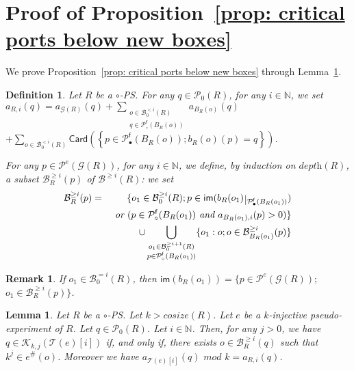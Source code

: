 \documentclass{article}
\theoremstyle{plain}
\newtheorem{definition}{Definition}
\newtheorem{lem}[theorem]{Lemma}
\newtheorem{rem}{Remark}
\newcommand{\Nat}{\ensuremath{\mathbb{N}}}
\newcommand{\taylor}[2]{\mathcal{T}(#1)[#2]}
\newcommand{\criticalports}[3]{\mathcal{K}_{#2, #3}(#1)}
\newcommand{\groundof}[1]{\mathcal{G}(#1)}
\newcommand{\cosize}[1]{\textit{cosize}(#1)}
\newcommand{\depthof}[1]{\textit{depth}(#1)}
\def\restriction#1#2{\mathchoice
              {\setbox1\hbox{${\displaystyle #1}_{\scriptstyle #2}$}
              \restrictionaux{#1}{#2}}
              {\setbox1\hbox{${\textstyle #1}_{\scriptstyle #2}$}
              \restrictionaux{#1}{#2}}
              {\setbox1\hbox{${\scriptstyle #1}_{\scriptscriptstyle #2}$}
              \restrictionaux{#1}{#2}}
              {\setbox1\hbox{${\scriptscriptstyle #1}_{\scriptscriptstyle #2}$}
              \restrictionaux{#1}{#2}}}
\def\restrictionaux#1#2{{#1\,\smash{\vrule height .8\ht1 depth .85\dp1}}_{\,#2}}
\newcommand{\im}[1]{\textsf{im}(#1)}
\newcommand{\portsatzero}[1]{\mathcal{P}_0(#1)}
\newcommand{\arity}[1]{{\textit{a}}_{#1}}
\newcommand{\Card}[1]{\textsf{Card}\left( #1 \right)}
\newcommand{\conclusionscirc}[1]{\mathcal{P}_\circ^{\textsf{f}}(#1)}
\newcommand{\conclusionsnotcirc}[1]{\mathcal{P}_\bullet^{\textsf{f}}(#1)}
\newcommand{\exactboxesatzero}[2]{\mathcal{B}_{0}^{=#2}(#1)}
\newcommand{\boxesgeq}[2]{\mathcal{B}^{\geq #2}(#1)}
\newcommand{\boxesatzerogeq}[2]{\mathcal{B}_0^{\geq #2}(#1)}
\newcommand{\boxesatzerosmaller}[2]{\mathcal{B}_0^{< #2}(#1)}
\newcommand{\exponentialports}[1]{\mathcal{P}^{\textit{e}}(#1)}
\begin{document}
\section{Proof of Proposition~\ref{prop: critical ports below new boxes}}


We prove Proposition~\ref{prop: critical ports below new boxes} through Lemma~\ref{lem: arity{taylor{e}{i}}(c) for c at depth 0}. 


\begin{definition}
Let $R$ be a $\circ$-PS. 
For any $q \in \portsatzero{R}$, for any $i \in \Nat$, we set 
$\arity{R, i}(q) = \arity{\groundof{R}}(q) + \sum_{\substack{o \in \boxesatzerosmaller{R}{i}\\ q \in \conclusionscirc{B_R(o)}}} \arity{B_R(o)}(q)$\\
$+ \sum_{o \in \boxesatzerosmaller{R}{i}} \Card{\left\lbrace p \in \conclusionsnotcirc{B_R(o)} ; b_{R}(o)(p) = q  \right\rbrace}$. 



For any $p \in \exponentialports{\groundof{R}}$, for any $i \in \Nat$, we define, by induction on $\depthof{R}$, a subset $\mathcal{B}_R^{\geq i}(p)$ of $\boxesgeq{R}{i}$: we set 
\begin{eqnarray*}
\mathcal{B}_R^{\geq i}(p) & = & \{ o_1 \in \boxesatzerogeq{R}{i} ; p \in \im{\restriction{b_R(o_1)}{\conclusionsnotcirc{B_R(o_1)}}}  \\
& & \textit{ or } (p \in \conclusionscirc{B_R(o_1)} \textit{ and } a_{B_R(o_1), i}(p) > 0) \}\\ 
& & \cup \bigcup_{\substack{o_1 \in \boxesatzerogeq{R}{i+1}\\ p \in \conclusionscirc{B_R(o_1)}}} \{ o_1 : o; o \in \mathcal{B}_{B_R(o_1)}^{\geq i}(p) \}
\end{eqnarray*}
\end{definition}

\begin{rem}
If $o_1 \in \exactboxesatzero{R}{i}$,  then $\im{b_R(o_1)} = \{ p \in \exponentialports{\groundof{R}} ; $ $o_1 \in \mathcal{B}_R^{\geq i}(p) \}$.
\end{rem}


\begin{lem}\label{lem: arity{taylor{e}{i}}(c) for c at depth 0}
Let $R$ be a $\circ$-PS. Let $k > \cosize{R}$. Let $e$ be a $k$-injective pseudo-experiment of $R$. Let $q \in \portsatzero{R}$. Let $i \in \Nat$. Then, for any $j > 0$, we have $q \in \criticalports{\taylor{e}{i}}{k}{j}$ if, and only if, there exists $o \in \mathcal{B}_R^{\geq i}(q)$ such that $k^j \in e^\#(o)$. Moreover we have $\arity{\taylor{e}{i}}(q) \textit{ mod } k = \arity{R, i}(q)$.
\end{lem}
\end{document}

